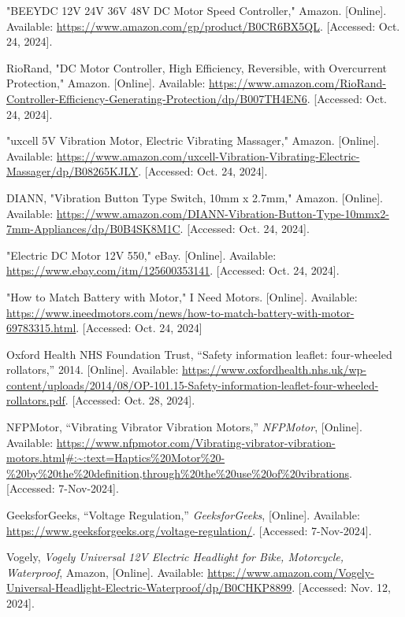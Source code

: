 \begin{thebibliography}{45}
	"BEEYDC 12V 24V 36V 48V DC Motor Speed Controller," Amazon. [Online]. Available: \url{https://www.amazon.com/gp/product/B0CR6BX5QL}. [Accessed: Oct. 24, 2024]. 
	
	RioRand, "DC Motor Controller, High Efficiency, Reversible, with Overcurrent Protection," Amazon. [Online]. Available: \url{https://www.amazon.com/RioRand-Controller-Efficiency-Generating-Protection/dp/B007TH4EN6}. [Accessed: Oct. 24, 2024]. 
	
	"uxcell 5V Vibration Motor, Electric Vibrating Massager," Amazon. [Online]. Available: \url{https://www.amazon.com/uxcell-Vibration-Vibrating-Electric-Massager/dp/B08265KJLY}. [Accessed: Oct. 24, 2024]. 
	
	DIANN, "Vibration Button Type Switch, 10mm x 2.7mm," Amazon. [Online]. Available: \url{https://www.amazon.com/DIANN-Vibration-Button-Type-10mmx2-7mm-Appliances/dp/B0B4SK8M1C}. [Accessed: Oct. 24, 2024]. 
	
	"Electric DC Motor 12V 550," eBay. [Online]. Available: \url{https://www.ebay.com/itm/125600353141}. [Accessed: Oct. 24, 2024]. 
	
	"How to Match Battery with Motor," I Need Motors. [Online]. Available: \url{https://www.ineedmotors.com/news/how-to-match-battery-with-motor-69783315.html}. [Accessed: Oct. 24, 2024]
	
	
	Oxford Health NHS Foundation Trust, ``Safety information leaflet: four-wheeled rollators,'' 2014. [Online]. Available: \url{https://www.oxfordhealth.nhs.uk/wp-content/uploads/2014/08/OP-101.15-Safety-information-leaflet-four-wheeled-rollators.pdf}. [Accessed: Oct. 28, 2024].
		 
	NFPMotor, ``Vibrating Vibrator Vibration Motors,'' \textit{NFPMotor}, [Online]. Available: \url{https://www.nfpmotor.com/Vibrating-vibrator-vibration-motors.html#:~:text=Haptics%20Motor%20-%20by%20the%20definition,through%20the%20use%20of%20vibrations}. [Accessed: 7-Nov-2024].
	
	GeeksforGeeks, ``Voltage Regulation,'' \textit{GeeksforGeeks}, [Online]. Available: \url{https://www.geeksforgeeks.org/voltage-regulation/}. [Accessed: 7-Nov-2024].
	
	Vogely, \textit{Vogely Universal 12V Electric Headlight for Bike, Motorcycle, Waterproof}, Amazon, [Online]. Available: \url{https://www.amazon.com/Vogely-Universal-Headlight-Electric-Waterproof/dp/B0CHKP8899}. [Accessed: Nov. 12, 2024].
	

\end{thebibliography}
